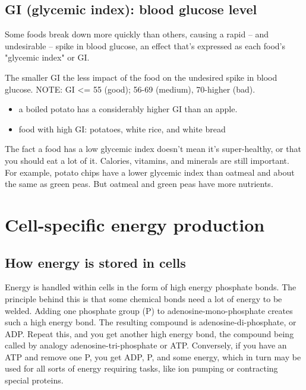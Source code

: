 \section{GI (glycemic index): blood glucose level}
\label{sec:glycemic-index}

Some foods break down more quickly than others, causing a rapid -- and
undesirable -- spike in blood glucose, an effect that's expressed as each food's
"glycemic index" or GI.

The smaller GI the less impact of the food on the undesired spike in
blood glucose. NOTE: GI <= 55 (good); 56-69 (medium), 70-higher (bad).

\begin{itemize}
  \item  a boiled potato has a considerably higher GI than an apple. 
  
  \item food with high GI: potatoes, white rice, and white bread
  
\end{itemize}

The fact a food has a low glycemic index doesn't mean it's super-healthy, or
that you should eat a lot of it. Calories, vitamins, and minerals are still
important. For example, potato chips have a lower glycemic index than oatmeal
and about the same as green peas. But oatmeal and green peas have more
nutrients.

\chapter{Cell-specific energy production}


\section{How energy is stored in cells }
\label{sec:high-energy-compound}

Energy is handled within cells in the form of high energy phosphate bonds.
The principle behind this is that some chemical bonds need a lot of energy to be
welded. Adding one phosphate group (P) to adenosine-mono-phosphate creates such
a high energy bond. The resulting compound is adenosine-di-phosphate, or ADP.
Repeat this, and you get another high energy bond, the compound being called by
analogy adenosine-tri-phosphate or ATP. Conversely, if you have an ATP and
remove one P, you get ADP, P, and some energy, which in turn may be used for all
sorts of energy requiring tasks, like ion pumping or contracting special
proteins. 

